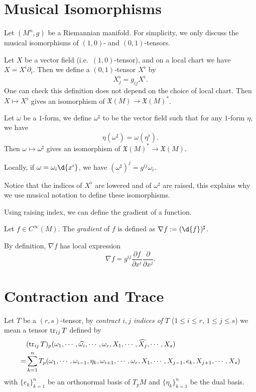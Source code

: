 \section{Musical Isomorphisms}
Let $(M^n,g)$ be a Riemannian manifold.
For simplicity, we only discuss the musical isomorphisms of $(1,0)$- and $(0,1)$-tensors.

\begin{defn}
    Let $X$ be a vector field (i.e.\ $(1,0)$-tensor), and on a local chart we have $X=X^i\partial_i$.
    Then we define a $(0,1)$-tensor $X^\flat$ by
    \[X^\flat_j=g_{ij}X^i.\]
    One can check this definition does not depend on the choice of local chart.
    Then $X\mapsto X^\flat$ gives an isomorphism of $\mathfrak{X}(M)\to\mathfrak{X}(M)^*$.
\end{defn}

\begin{defn}
    Let $\omega$ be a $1$-form, we define $\omega^\sharp$ to be the vector field such that for any $1$-form $\eta$, we have
    \[\eta(\omega^\sharp)=\omega(\eta^\flat).\]
    Then $\omega\mapsto\omega^\sharp$ gives an isomorphism of $\mathfrak{X}(M)^*\to\mathfrak{X}(M)$.
\end{defn}

Locally, if $\omega=\omega_i\d{x^i}$, we have $(\omega^\sharp)^j=g^{ij}\omega_i$.

Notice that the indices of $X^\flat$ are lowered and of $\omega^\sharp$ are raised, this explains why we use musical notation to define these isomorphisms.

Using raising index, we can define the gradient of a function.
\begin{defn}
    Let $f\in C^\infty(M)$.
    The \emph{gradient} of $f$ is defined as $\nabla f:=(\d{f})^\sharp$.
\end{defn}

By definition, $\nabla f$ has local expression
\[\nabla f=g^{ij}\frac{\partial f}{\partial{x^i}}\frac{\partial{}}{\partial{x^j}}.\]

\section{Contraction and Trace}

\begin{defn}
    Let $T$ be a $(r,s)$-tensor, by \emph{contract $i,j$ indices of $T$} ($1\leq i\leq r$, $1\leq j\leq s$) we mean a tensor $\operatorname{tr}_{ij}T$ defined by
    \begin{align*}
        &(\operatorname{tr}_{ij}T)_p(\omega_1,\cdots,\widehat{\omega_i},\cdots,\omega_r,X_1,\cdots,\widehat{X_j},\cdots,X_s)\\
        =&\sum_{k=1}^nT_p(\omega_1,\cdots,\omega_{i-1},\eta_k,\omega_{i+1},\cdots,\omega_r,X_1,\cdots,X_{j-1},e_k,X_{j+1},\cdots,X_s)
    \end{align*}
    with $\{e_k\}_{k=1}^n$ be an orthonormal basis of $T_pM$ and $\{\eta_k\}_{k=1}^n$ be the dual basis.
\end{defn}

